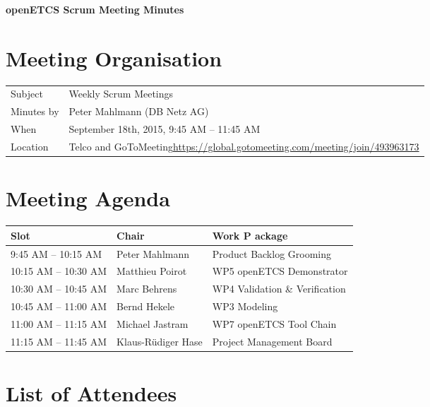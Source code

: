 \documentclass[a4paper, 11pt]{article}
\begin{document}
{\begin{center}\huge\bf openETCS Scrum Meeting Minutes\end{center}}

\section{Meeting Organisation}

\renewcommand{\arraystretch}{1.5}
\begin{supertabular}{m{.2\textwidth}m{.8\textwidth}}
Subject & Weekly Scrum Meetings\\
Minutes by & Peter Mahlmann (DB Netz AG)\\
When & September 18th, 2015, 9:45 AM -- 11:45 AM\\
Location & Telco and GoToMeeting\newline \url{https://global.gotomeeting.com/meeting/join/493963173}\\
\end{supertabular}

\renewcommand{\arraystretch}{1.0}
\section{Meeting Agenda}

\begin{tabular}{lll}
\toprule
\textbf{Slot} &  \textbf{Chair} & \textbf{Work P ackage} \\
\midrule 
9:45 AM -- 10:15 AM & Peter Mahlmann & Product Backlog Grooming  \\
10:15 AM -- 10:30 AM & Matthieu Poirot & WP5 openETCS Demonstrator \\  
10:30 AM -- 10:45 AM & Marc Behrens & WP4 Validation \& Verification \\
10:45 AM -- 11:00 AM & Bernd Hekele & WP3 Modeling \\
11:00 AM -- 11:15 AM & Michael Jastram & WP7 openETCS Tool Chain \\
11:15 AM -- 11:45 AM & Klaus-R\"udiger Hase & Project Management Board \\
\bottomrule
\end{tabular}

\section{List of Attendees}
\end{document}
